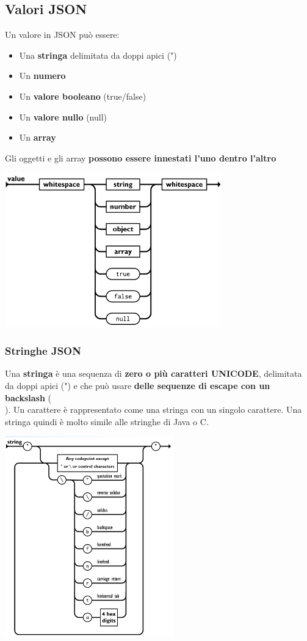 \documentclass[12pt]{article}
\begin{document}
\subsection{Valori JSON}
Un valore in JSON può essere:
\begin{itemize}
    \item Una \textbf{stringa} delimitata da doppi apici (")
    \item Un \textbf{numero}
    \item Un \textbf{valore booleano} (true/false)
    \item Un \textbf{valore nullo} (null)
    \item Un \textbf{array}
\end{itemize}
Gli oggetti e gli array \textbf{possono essere innestati l'uno dentro l'altro}
\begin{center}
    \includegraphics[width = 0.70\textwidth]{Images/173.png}
\end{center}
\newpage
\subsubsection{Stringhe JSON}
Una \textbf{stringa} è una sequenza di \textbf{zero o più caratteri UNICODE}, delimitata da doppi apici (") e che può usare \textbf{delle sequenze di escape con un backslash} (\\).
Un carattere è rappresentato come una stringa con un singolo carattere. Una stringa quindi è molto simile alle stringhe di Java o C.
\begin{center}
    \includegraphics[width = 0.55\textwidth]{Images/174.png}
\end{center}
\end{document}
